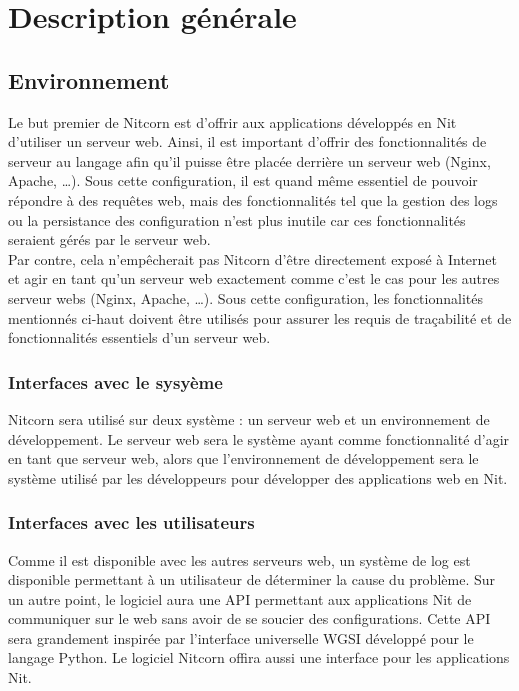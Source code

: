 \documentclass{scrreprt}
\begin{document}
\chapter{Description générale}
\section{Environnement}
Le but premier de Nitcorn est d'offrir aux applications développés en Nit
d'utiliser
un serveur web. Ainsi, il est important d'offrir des fonctionnalités de serveur
au langage afin qu'il puisse être placée derrière un serveur web (Nginx, Apache,
\ldots).
Sous cette configuration, il est quand même essentiel de pouvoir répondre à des
requêtes web, mais des fonctionnalités tel que la gestion des logs ou la
persistance
des configuration n'est plus inutile car ces fonctionnalités seraient gérés par
le serveur web.\\
Par contre, cela n'empêcherait pas Nitcorn d'être directement exposé à Internet
et agir en tant qu'un serveur web exactement comme c'est le cas pour les autres
serveur webs (Nginx, Apache, \ldots). Sous cette configuration, les
fonctionnalités
mentionnés ci-haut doivent être utilisés pour assurer les requis de traçabilité
et de fonctionnalités essentiels d'un serveur web.

\subsection{Interfaces avec le sysyème}
Nitcorn sera utilisé sur deux système : un serveur web et un environnement de développement.
Le serveur web sera le système ayant comme fonctionnalité d'agir en tant que serveur web, alors
que l'environnement de développement sera le système utilisé par les développeurs
pour développer des applications web en Nit.

\subsection{Interfaces avec les utilisateurs}
Comme il est disponible avec les autres serveurs web, un système de log est
disponible permettant à un utilisateur de déterminer la cause du problème. Sur
un autre point, le logiciel aura une API permettant aux applications Nit de 
communiquer sur le web sans avoir de se soucier des configurations. Cette
API sera grandement inspirée par l'interface universelle WGSI développé pour
le langage Python. Le logiciel Nitcorn offira aussi une interface pour les
applications Nit.
\end{document}
